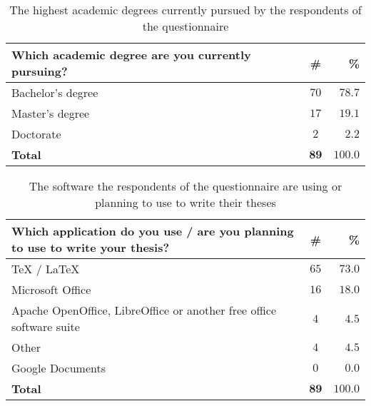 \begin{table}
  \caption{The highest academic degrees currently pursued by the respondents of the questionnaire}
  \begin{tabularx}{\textwidth}{Xcr}
    \textbf{Which academic degree are you currently pursuing?} & \textbf{\#} & \textbf{\%} \\
    \hline
    Bachelor's degree            & $70$          & $78.7$ \\
    Master's degree              & $17$          & $19.1$ \\
    Doctorate                    & $2$           & $2.2$  \\
    \hline
    \textbf{Total}               & $\mathbf{89}$ & $\mathbf{100.0}$
  \end{tabularx}
  \label{table:survey-type}
\end{table}

\begin{table}
  \caption{The software the respondents of the questionnaire are using or planning to use to write their theses}
  \begin{tabularx}{\textwidth}{Xcr}
    \textbf{Which application do you use / are you planning to use to write your thesis?} & \textbf{\#} & \textbf{\%} \\
    \hline
    \TeX{ / \LaTeX{}}            & $65$          & $73.0$ \\
    Microsoft Office             & $16$          & $18.0$ \\
    Apache OpenOffice, LibreOffice
    or another free office
    software suite               & $4$           &  $4.5$ \\
    Other                        & $4$           &  $4.5$ \\
    Google Documents             & $0$           &  $0.0$ \\
    \hline
    \textbf{Total}               & $\mathbf{89}$ & $\mathbf{100.0}$
  \end{tabularx}
  \label{table:survey-sw}
\end{table}

